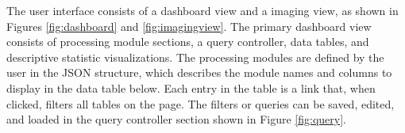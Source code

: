 The user interface consists of a dashboard view and a imaging view, as shown in Figures \ref{fig:dashboard} and \ref{fig:imagingview}. The primary dashboard view consists of processing module sections, a query controller, data tables, and descriptive statistic visualizations. The processing modules are defined by the user in the JSON structure, which describes the module names and columns to display in the data table below. Each entry in the table is a link that, when clicked, filters all tables on the page. The filters or queries can be saved, edited, and loaded in the query controller section shown in Figure \ref{fig:query}. 